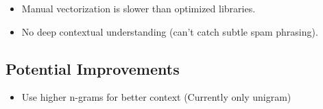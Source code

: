 \begin{itemize}
    \item Manual vectorization is slower than optimized libraries.
    \item No deep contextual understanding (can't catch subtle spam phrasing).
\end{itemize}


\subsection{Potential Improvements}

\begin{itemize}
    \item Use higher n-grams for better context (Currently only unigram)
\end{itemize}
